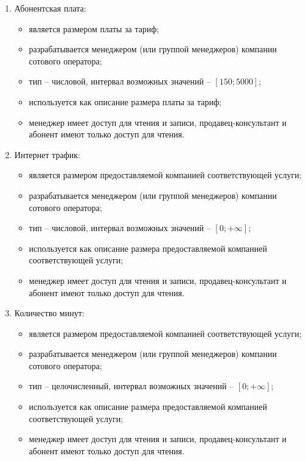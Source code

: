 \begin{enumerate}
\begin{enumerate}
        \item Абонентская плата:
        \begin{itemize}
            \item является размером платы за тариф;
            \item разрабатывается менеджером (или группой менеджеров) компании сотового оператора;
            \item тип -- числовой, интервал возможных значений -- $[150; 5000]$;
            \item используется как описание размера платы за тариф;
            \item менеджер имеет доступ для чтения и записи, продавец-консультант и абонент имеют только доступ для чтения.
        \end{itemize}

        \item Интернет трафик:
        \begin{itemize}
            \item является размером предоставляемой компанией соответствующей услуги;
            \item разрабатывается менеджером (или группой менеджеров) компании сотового оператора;
            \item тип -- числовой, интервал возможных значений -- $[0; +\infty]$; %
            \item используется как описание размера предоставляемой компанией соответствующей услуги;
            \item менеджер имеет доступ для чтения и записи, продавец-консультант и абонент имеют только доступ для чтения.
        \end{itemize}

        \item Количество минут:
        \begin{itemize}
            \item является размером предоставляемой компанией соответствующей услуги;
            \item разрабатывается менеджером (или группой менеджеров) компании сотового оператора;
            \item тип -- целочисленный, интервал возможных значений -- $[0; +\infty]$; %
            \item используется как описание размера предоставляемой компанией соответствующей услуги;
            \item менеджер имеет доступ для чтения и записи, продавец-консультант и абонент имеют только доступ для чтения.
        \end{itemize}


\end{enumerate}
\end{enumerate}
